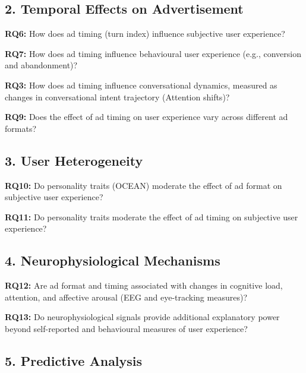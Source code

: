\documentclass{article}
\begin{document}
\subsection{2. Temporal Effects on Advertisement}

\textbf{RQ6:} How does ad timing (turn index) influence subjective user experience?

\textbf{RQ7:} How does ad timing influence behavioural user experience (e.g., conversion and abandonment)?

\textbf{RQ3:} How does ad timing influence conversational dynamics, measured as changes in conversational intent trajectory (Attention shifts)?

\textbf{RQ9:} Does the effect of ad timing on user experience vary across different ad formats?

\subsection{3. User Heterogeneity}

\textbf{RQ10:} Do personality traits (OCEAN) moderate the effect of ad format on subjective user experience?

\textbf{RQ11:} Do personality traits moderate the effect of ad timing on subjective user experience?

\subsection{4. Neurophysiological Mechanisms}

\textbf{RQ12:} Are ad format and timing associated with changes in cognitive load, attention, and affective arousal (EEG and eye-tracking measures)?

\textbf{RQ13:} Do neurophysiological signals provide additional explanatory power beyond self-reported and behavioural measures of user experience?

\subsection{5. Predictive Analysis}
\end{document}
